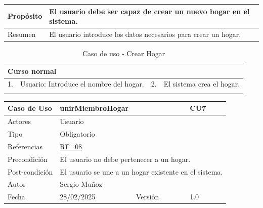 \begin{table}[H]
    \centering
    \begin{tabular}{| m{} | m{} | m{} | m{} |}
        \hline
        Propósito & \multicolumn{3}{m{0.67\textwidth}|}{El usuario debe ser capaz de crear un nuevo hogar en el sistema.} \\ 
        \hline
        Resumen & \multicolumn{3}{m{0.67\textwidth}|}{El usuario introduce los datos necesarios para crear un hogar.} \\ 
        \hline
    \end{tabular}
\end{table}

\begin{table}[H]
    \centering
    \begin{tabular}{| m{} | m{} | m{} | m{} |}
        \hline
        \multicolumn{4}{|m{0.9\textwidth}|}{Curso normal} \\ 
        \hline
        1. & Usuario: Introduce el nombre del hogar. 
        & 2. & El sistema crea el hogar. \\ 
        \hline
        
        &  &  &\\ 
        \hline
    \end{tabular}
    \caption{Caso de uso - Crear Hogar}
\end{table}

\newpage

\begin{table}[H]
    \centering
    \begin{tabular}{| m{} | m{} | m{} | m{} |}
        \hline
        \rowcolor[HTML]{C0C0C0} Caso de Uso & \multicolumn{2}{|m{0.43\textwidth}|}{unirMiembroHogar} &  CU7\\ 
        \hline
        Actores & \multicolumn{3}{l|}{Usuario} \\ 
        \hline
        Tipo & \multicolumn{3}{l|}{Obligatorio} \\ 
        \hline
        Referencias & \multicolumn{3}{l|}{\hyperref[req:RF08]{RF\_08}} \\ 
        \hline
        Precondición & \multicolumn{3}{m{0.67\textwidth}|}{El usuario no debe pertenecer a un hogar.} \\ 
        \hline
        Post-condición & \multicolumn{3}{m{0.67\textwidth}|}{El usuario se une a un hogar existente en el sistema.} \\ 
        \hline
        Autor & \multicolumn{3}{l|}{Sergio Muñoz} \\ 
        \hline
        Fecha & 28/02/2025 & Versión & 1.0 \\ 
        \hline
    \end{tabular}
\end{table}



